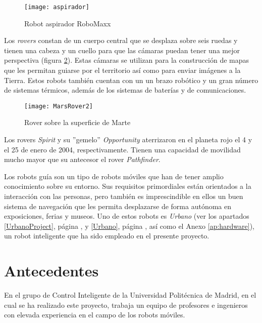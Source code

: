 \begin{figure}[hbt]
  \centering\texttt{[image: aspirador]}\\
  \caption{Robot aspirador RoboMaxx }\label{fg:aspirador}
\end{figure}

Los \emph{rovers} constan de un cuerpo central que se desplaza sobre seis ruedas y tienen una cabeza y un cuello para que las cámaras puedan tener una mejor perspectiva (figura \ref{fg:rover}). Estas cámaras se utilizan para la construcción de mapas que les permitan guiarse por el territorio así como para enviar imágenes a la Tierra. Estos robots también cuentan con un un brazo robótico y un gran número de sistemas térmicos, además de los sistemas de baterías y de comunicaciones.

\begin{figure}[hbt]
  \centering\texttt{[image: MarsRover2]}\\
  \caption{Rover sobre la superficie de Marte}\label{fg:rover}
\end{figure}

Los rovers \emph{Spirit} y su ''gemelo''  \emph{Opportunity} aterrizaron en el planeta rojo el 4 y el 25 de enero de 2004, respectivamente. Tienen una capacidad de movilidad mucho mayor que su antecesor el rover \emph{Pathfinder}.

Los robots guía son un tipo de robots móviles que han de tener amplio conocimiento sobre su entorno. Sus requisitos primordiales están orientados a la interacción con las personas, pero también es imprescindible en ellos un buen sistema de navegación que les permita desplazarse de forma autónoma en exposiciones, ferias y museos. Uno de estos robots es \emph{Urbano} (ver los apartados \ref{UrbanoProject}, página \pageref{UrbanoProject},  y \ref{Urbano}, página \pageref{Urbano}, así como el Anexo \ref{ap:hardware}), un robot inteligente que ha sido empleado en el presente proyecto.

\section{Antecedentes}

En el grupo de Control Inteligente de la Universidad Politécnica de Madrid, en el cual se ha realizado este proyecto, trabaja un equipo de profesores e ingenieros con elevada experiencia en el campo de los robots móviles.

